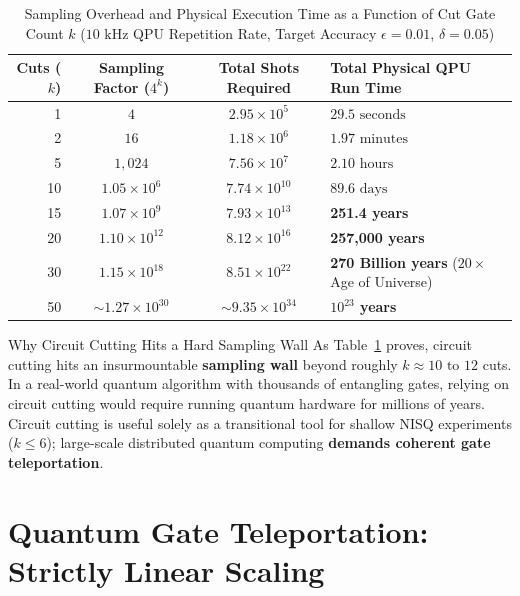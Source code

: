 \begin{table}[htbp]
\centering
\caption{Sampling Overhead and Physical Execution Time as a Function of Cut Gate Count $k$ ($10\text{ kHz}$ QPU Repetition Rate, Target Accuracy $\epsilon = 0.01$, $\delta = 0.05$)}
\label{tab:cutting_overhead}
\begin{tabular}{r c c l}
\toprule
\textbf{Cuts ($k$)} & \textbf{Sampling Factor ($4^k$)} & \textbf{Total Shots Required} & \textbf{Total Physical QPU Run Time} \\
\midrule
1 & $4$ & $2.95 \times 10^5$ & $29.5\text{ seconds}$ \\
2 & $16$ & $1.18 \times 10^6$ & $1.97\text{ minutes}$ \\
5 & $1{,}024$ & $7.56 \times 10^7$ & $2.10\text{ hours}$ \\
10 & $1.05 \times 10^6$ & $7.74 \times 10^{10}$ & $89.6\text{ days}$ \\
15 & $1.07 \times 10^9$ & $7.93 \times 10^{13}$ & \textbf{251.4 years} \\
20 & $1.10 \times 10^{12}$ & $8.12 \times 10^{16}$ & \textbf{257,000 years} \\
30 & $1.15 \times 10^{18}$ & $8.51 \times 10^{22}$ & \textbf{270 Billion years} ($20\times$ Age of Universe) \\
50 & $\sim 1.27 \times 10^{30}$ & $\sim 9.35 \times 10^{34}$ & \textbf{$10^{23}$ years} \\
\bottomrule
\end{tabular}
\end{table}

\begin{insightbox}{Why Circuit Cutting Hits a Hard Sampling Wall}
As Table~\ref{tab:cutting_overhead} proves, circuit cutting hits an insurmountable \textbf{sampling wall} beyond roughly $k \approx 10\text{ to }12$ cuts. In a real-world quantum algorithm with thousands of entangling gates, relying on circuit cutting would require running quantum hardware for millions of years. Circuit cutting is useful solely as a transitional tool for shallow NISQ experiments ($k \le 6$); large-scale distributed quantum computing \textbf{demands coherent gate teleportation}.
\end{insightbox}

\section{Quantum Gate Teleportation: Strictly Linear Scaling}
\label{sec:teleportation_linear_scaling}

